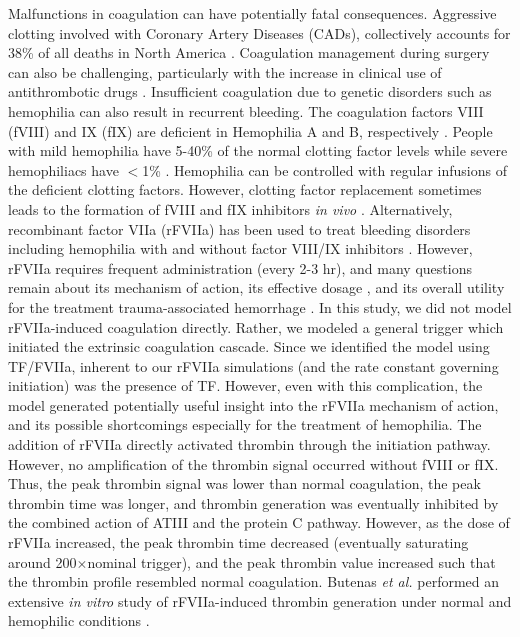 \documentclass[12pt]{article}
\begin{document}
Malfunctions in coagulation can have potentially fatal consequences.
Aggressive clotting involved with Coronary Artery Diseases (CADs), collectively accounts for 38\% of all deaths in North America \cite{HANSSON2005}.
Coagulation management during surgery can also be challenging, particularly with the increase in clinical use of antithrombotic drugs \cite{Tanaka:2009wo}.   
Insufficient coagulation due to genetic disorders such as hemophilia can also result in recurrent bleeding. 
The coagulation factors VIII (fVIII) and IX (fIX) are deficient in Hemophilia A and B, respectively \cite{COOPER1994,MANNUCCI2001,MITCHELL2008}.
People with mild hemophilia have 5-40\% of the normal clotting factor levels while severe hemophiliacs have $<$1\% \cite{MITCHELL2008}.
Hemophilia can be controlled with regular infusions of the deficient clotting factors. 
However, clotting factor replacement sometimes leads to the formation of fVIII and fIX inhibitors \emph{in vivo} \cite{TOMOKIYO2003}.
Alternatively, recombinant factor VIIa (rFVIIa) has been used to treat bleeding disorders \cite{Hedner:2008rm,Talbot:2009kk} including
hemophilia with and without factor VIII/IX inhibitors \cite{Shapiro:2008px}.
However, rFVIIa requires frequent administration (every 2-3 hr), and many questions remain about its mechanism of action, 
its effective dosage \cite{TOMOKIYO2003}, and its overall utility for the treatment trauma-associated hemorrhage \cite{Duchesne:2008hw}. 
In this study, we did not model rFVIIa-induced coagulation directly. 
Rather, we modeled a general trigger which initiated the extrinsic coagulation cascade. 
Since we identified the model using TF/FVIIa, inherent to our rFVIIa simulations (and the rate constant governing initiation) 
was the presence of TF. However, even with this complication, 
the model generated potentially useful insight into the rFVIIa mechanism of action, and its possible shortcomings especially for the treatment of hemophilia. 
The addition of rFVIIa directly activated thrombin through the initiation pathway. 
However, no amplification of the thrombin signal occurred without fVIII or fIX. 
Thus, the peak thrombin signal was lower than normal coagulation, the peak thrombin time was longer, and thrombin generation was eventually inhibited by the combined action of ATIII and the protein C pathway.
However, as the dose of rFVIIa increased, the peak thrombin time decreased (eventually saturating around 200$\times$nominal trigger), and the peak thrombin value increased such that
the thrombin profile resembled normal coagulation.
Butenas \emph{et al.} performed an extensive \textit{in vitro} study of rFVIIa-induced thrombin generation under normal and hemophilic conditions \citep{Butenas:2002ab}.
\end{document}
